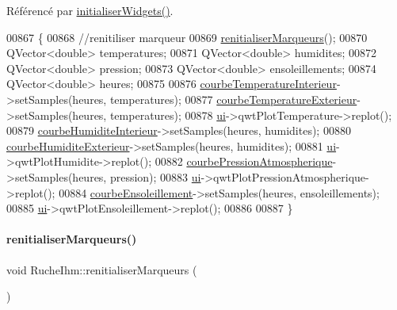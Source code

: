 Référencé par \hyperlink{class_ruche_ihm_a98c493fcd2ef145a3d51ff84bbf8748e}{initialiser\+Widgets()}.


\begin{DoxyCode}
00867 \{
00868     \textcolor{comment}{//renitiliser marqueur}
00869     \hyperlink{class_ruche_ihm_aa136c7922dc441aa86c00ec2d9c8b71c}{renitialiserMarqueurs}();
00870     QVector<double> temperatures;
00871     QVector<double> humidites;
00872     QVector<double> pression;
00873     QVector<double> ensoleillements;
00874     QVector<double> heures;
00875 
00876     \hyperlink{class_ruche_ihm_a6ce372c8df13bb78c09705432dcfcf58}{courbeTemperatureInterieur}->setSamples(heures, temperatures);
00877     \hyperlink{class_ruche_ihm_a68e72873a859840d3c91b147b8559118}{courbeTemperatureExterieur}->setSamples(heures, temperatures);
00878     \hyperlink{class_ruche_ihm_a64786058bd7f88ca2f1e9743bb27c25b}{ui}->qwtPlotTemperature->replot();
00879     \hyperlink{class_ruche_ihm_a19a58f5841dc91eb7f84acd419f35678}{courbeHumiditeInterieur}->setSamples(heures, humidites);
00880     \hyperlink{class_ruche_ihm_a0c9d769a392e3c1332f8908cd9d558eb}{courbeHumiditeExterieur}->setSamples(heures, humidites);
00881     \hyperlink{class_ruche_ihm_a64786058bd7f88ca2f1e9743bb27c25b}{ui}->qwtPlotHumidite->replot();
00882     \hyperlink{class_ruche_ihm_aa6685f1fc20aa4459eab3b0bb3c4d1ef}{courbePressionAtmospherique}->setSamples(heures, pression);
00883     \hyperlink{class_ruche_ihm_a64786058bd7f88ca2f1e9743bb27c25b}{ui}->qwtPlotPressionAtmospherique->replot();
00884     \hyperlink{class_ruche_ihm_af160181f408b3a9519b97e67c810a0fd}{courbeEnsoleillement}->setSamples(heures, ensoleillements);
00885     \hyperlink{class_ruche_ihm_a64786058bd7f88ca2f1e9743bb27c25b}{ui}->qwtPlotEnsoleillement->replot();
00886 
00887 \}
\end{DoxyCode}
\mbox{\label{class_ruche_ihm_aa136c7922dc441aa86c00ec2d9c8b71c}} 
\paragraph{\texorpdfstring{renitialiser\+Marqueurs()}{renitialiserMarqueurs()}}
{\footnotesize\ttfamily void Ruche\+Ihm\+::renitialiser\+Marqueurs (\begin{DoxyParamCaption}{ }\end{DoxyParamCaption})\hspace{0.3cm}{\ttfamily [private]}}



